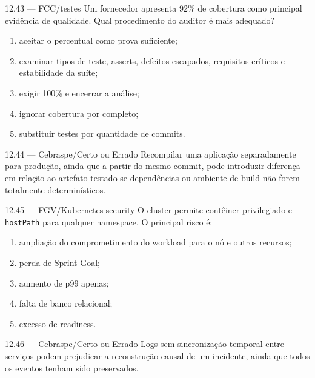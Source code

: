 \begin{questao}{ 12.43 — FCC/testes}
Um fornecedor apresenta 92\% de cobertura como principal evidência de qualidade. Qual procedimento do auditor é mais adequado?
\begin{enumerate}[label=\Alph*)]
\item aceitar o percentual como prova suficiente;
\item examinar tipos de teste, asserts, defeitos escapados, requisitos críticos e estabilidade da suíte;
\item exigir 100\% e encerrar a análise;
\item ignorar cobertura por completo;
\item substituir testes por quantidade de commits.
\end{enumerate}
\end{questao}

\begin{questao}{ 12.44 — Cebraspe/Certo ou Errado}
Recompilar uma aplicação separadamente para produção, ainda que a partir do mesmo commit, pode introduzir diferença em relação ao artefato testado se dependências ou ambiente de build não forem totalmente determinísticos.
\end{questao}

\begin{questao}{ 12.45 — FGV/Kubernetes security}
O cluster permite contêiner privilegiado e \texttt{hostPath} para qualquer namespace. O principal risco é:
\begin{enumerate}[label=\Alph*)]
\item ampliação do comprometimento do workload para o nó e outros recursos;
\item perda de Sprint Goal;
\item aumento de p99 apenas;
\item falta de banco relacional;
\item excesso de readiness.
\end{enumerate}
\end{questao}

\begin{questao}{ 12.46 — Cebraspe/Certo ou Errado}
Logs sem sincronização temporal entre serviços podem prejudicar a reconstrução causal de um incidente, ainda que todos os eventos tenham sido preservados.
\end{questao}

